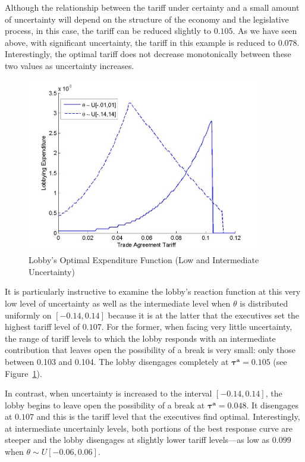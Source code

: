 \documentclass[10pt]{article}
\newcommand{\ve}{\theta}
\newcommand{\bta}{\bm{\tau^a}}
\begin{document}
Although the relationship between the tariff under certainty and a small amount of uncertainty will depend on the structure of the economy and the legislative process, in this case, the tariff can be reduced slightly to $0.105$. As we have seen above, with significant uncertainty, the tariff in this example is reduced to $0.078$. Interestingly, the optimal tariff does not decrease monotonically between these two values as uncertainty increases.

\begin{figure}
\begin{center}
\includegraphics[height=3in, width=4in]{lobby_br.jpg}
\end{center}
\caption{Lobby's Optimal Expenditure Function (Low and Intermediate Uncertainty)\label{fig:lobby_br}}
\end{figure}

It is particularly instructive to examine the lobby's reaction function at this very low level of uncertainty as well as the intermediate level when $\ve$ is distributed uniformly on $[-0.14,0.14]$ because it is at the latter that the executives set the highest tariff level of $0.107$. For the former, when facing very little uncertainty, the range of tariff levels to which the lobby responds with an intermediate contribution that leaves open the possibility of a break is very small: only those between 0.103 and 0.104. The lobby disengages completely at $\bta=0.105$ (see Figure~\ref{fig:lobby_br}).

In contrast, when uncertainty is increased to the interval $[-0.14,0.14]$, the lobby begins to leave open the possibility of a break at $\bta = 0.048$. It disengages at $0.107$ and this is the tariff level that the executives find optimal. Interestingly, at intermediate uncertainly levels, both portions of the best response curve are steeper and the lobby disengages at slightly lower tariff levels---as low as $0.099$ when $\ve \sim U[-0.06,0.06]$.
\end{document}
